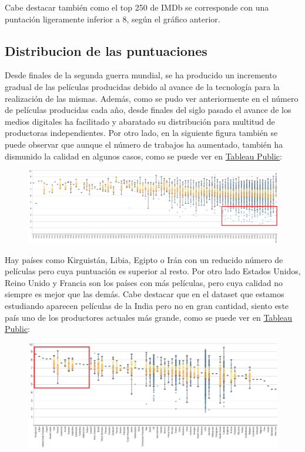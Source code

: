\documentclass{article}
\begin{document}
Cabe destacar también como el top 250 de IMDb se corresponde con una puntación ligeramente inferior a 8, según el gráfico anterior.

\subsection{Distribucion de las puntuaciones}

Desde finales de la segunda guerra mundial, se ha producido un incremento gradual de las películas producidas debido al avance de la tecnología para la realización de las mismas. Además, como se pudo ver anteriormente en el número de películas producidas cada año, desde finales del siglo pasado el avance de los medios digitales ha facilitado y abaratado su distribución para multitud de productoras independientes\cite{popmatters}. Por otro lado, en la siguiente figura también se puede observar que aunque el número de trabajos ha aumentado, también ha dismunido la calidad en algunos casos, como se puede ver en \href{https://public.tableau.com/profile/javier6580\#!/vizhome/proyecto_fin_de_master_dataset/rating_year}{Tableau Public}:

\begin{figure}[h]
\centering
\includegraphics[width=\textwidth,keepaspectratio]{./images_latex/rating_year}
\end{figure}

Hay países como Kirguistán, Libia, Egipto o Irán con un reducido número de películas pero cuya puntuación es superior al resto. Por otro lado Estados Unidos, Reino Unido y Francia son los países con más películas, pero cuya calidad no siempre es mejor que las demás. Cabe destacar que en el dataset que estamos estudiando aparecen películas de la India pero no en gran cantidad, siento este país uno de los productores actuales más grande, como se puede ver en \href{https://public.tableau.com/profile/javier6580\#!/vizhome/proyecto_fin_de_master_dataset/rating_country}{Tableau Public}:

\begin{figure}[h]
\centering
\includegraphics[width=\textwidth,keepaspectratio]{./images_latex/rating_country}
\end{figure}
\end{document}
